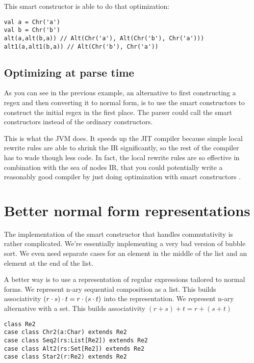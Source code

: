 \documentclass[a4paper, 11pt]{article}
\theoremstyle{definition}
\begin{document}
This smart constructor is able to do that optimization:

\begin{lstlisting}
val a = Chr('a')
val b = Chr('b')
alt(a,alt(b,a)) // Alt(Chr('a'), Alt(Chr('b'), Chr('a')))
alt1(a,alt1(b,a)) // Alt(Chr('b'), Chr('a'))
\end{lstlisting}

\subsection{Optimizing at parse time}

As you can see in the previous example, an alternative to first constructing a regex and then converting it to normal form, is to use the smart constructors to construct the initial regex in the first place. The parser could call the smart constructors instead of the ordinary constructors.

This is what the JVM does. It speeds up the JIT compiler because simple local rewrite rules are able to shrink the IR significantly, so the rest of the compiler has to wade though less code. In fact, the local rewrite rules are so effective in combination with the sea of nodes IR, that you could potentially write a reasonably good compiler by just doing optimization with smart constructors \cite{click95}.


\section{Better normal form representations}

The implementation of the smart constructor that handles commutativity is rather complicated. We're essentially implementing a very bad version of bubble sort. We even need separate cases for an element in the middle of the list and an element at the end of the list.

A better way is to use a representation of regular expressions tailored to normal forms. We represent n-ary sequential composition as a list. This builds associativity $(r \cdot s) \cdot t = r \cdot (s \cdot t)$ into the representation. We represent n-ary alternative with a set. This builds associativity $(r + s) + t = r + (s + t)$

\begin{lstlisting}
class Re2
case class Chr2(a:Char) extends Re2
case class Seq2(rs:List[Re2]) extends Re2
case class Alt2(rs:Set[Re2]) extends Re2
case class Star2(r:Re2) extends Re2
\end{lstlisting}
\end{document}
